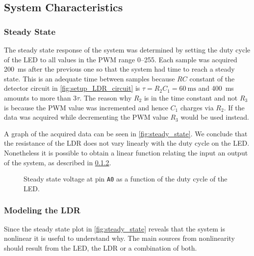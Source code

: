 \subsection{System Characteristics}
\label{sec:SystemCharacteristics}

\subsubsection{Steady State}
\label{sub:SteadyState}

The steady state response of the system was determined by setting the duty cycle of the LED to all values in the PWM range 0--255. Each sample was acquired \SI{200}{\milli\second} after the previous one so that the system had time to reach a steady state. This is an adequate time between samples because $RC$ constant of the detector circuit in \autoref{fig:setup_LDR_circuit} is $\tau = R_2C_1 = \SI{60}{\milli\second}$ and \SI{400}{\milli\second} amounts to more than $3\tau$. The reason why $R_2$ is in the time constant and not $R_3$ is because the PWM value was incremented and hence $C_1$ charges via $R_2$. If the data was acquired while decrementing the PWM value $R_3$ would be used instead.


A graph of the acquired data can be seen in \autoref{fig:steady_state}. We conclude that the resistance of the LDR does not vary linearly with the duty cycle on the LED. Nonetheless it is possible to obtain a linear function relating the input an output of the system, as described in \ref{subsubsec:LDR_model}.

\begin{figure}[h]
    \centering
    \resizebox{\textwidth}{!}{}
    \caption{Steady state voltage at pin \texttt{A0} as a function of the duty cycle of the LED.}
    \label{fig:steady_state}
\end{figure}

\subsubsection{Modeling the LDR}
\label{subsubsec:LDR_model}

Since the steady state plot in \autoref{fig:steady_state} reveals that the system is nonlinear it is useful to understand why. The main sources from nonlinearity should result from the LED, the LDR or a combination of both.


